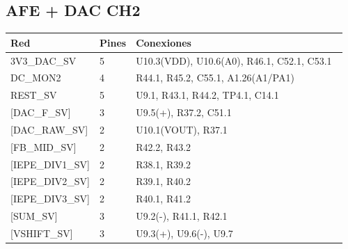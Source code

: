 \documentclass[10pt,a4paper]{article}
\begin{document}
\subsection*{AFE + DAC CH2}
{\footnotesize\begin{longtable}{@{}L{0.2\linewidth}L{0.06\linewidth}L{0.7\linewidth}@{}}\toprule
\textbf{Red} & \textbf{Pines} & \textbf{Conexiones}\\\midrule\endhead
3V3\_\allowbreak{}DAC\_\allowbreak{}SV & 5 & U10.3(VDD), U10.6(A0), R46.1, C52.1, C53.1\\
DC\_\allowbreak{}MON2 & 4 & R44.1, R45.2, C55.1, A1.26(A1/PA1)\\
REST\_\allowbreak{}SV & 5 & U9.1, R43.1, R44.2, TP4.1, C14.1\\
{[}DAC\_\allowbreak{}F\_\allowbreak{}SV{]} & 3 & U9.5(+), R37.2, C51.1\\
{[}DAC\_\allowbreak{}RAW\_\allowbreak{}SV{]} & 2 & U10.1(VOUT), R37.1\\
{[}FB\_\allowbreak{}MID\_\allowbreak{}SV{]} & 2 & R42.2, R43.2\\
{[}IEPE\_\allowbreak{}DIV1\_\allowbreak{}SV{]} & 2 & R38.1, R39.2\\
{[}IEPE\_\allowbreak{}DIV2\_\allowbreak{}SV{]} & 2 & R39.1, R40.2\\
{[}IEPE\_\allowbreak{}DIV3\_\allowbreak{}SV{]} & 2 & R40.1, R41.2\\
{[}SUM\_\allowbreak{}SV{]} & 3 & U9.2(-), R41.1, R42.1\\
{[}VSHIFT\_\allowbreak{}SV{]} & 3 & U9.3(+), U9.6(-), U9.7\\
\bottomrule\end{longtable}}
\end{document}
